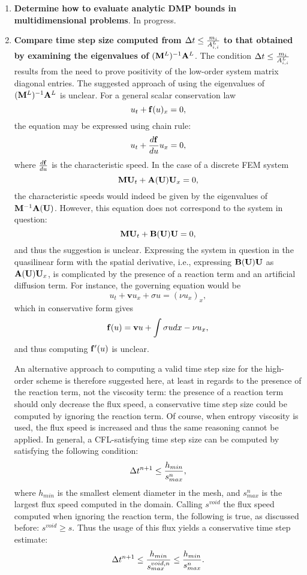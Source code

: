 \begin{enumerate}
\item \textbf{Determine how to evaluate analytic DMP bounds in multidimensional problems}.
In progress.

\item \textbf{Compare time step size computed from $\Delta t\leq\frac{m_i}{A^L_{i,i}}$ to
that obtained by examining the eigenvalues of $(\mathbf{M}^L)^{-1}\mathbf{A}^L$}.
The condition $\Delta t\leq\frac{m_i}{A^L_{i,i}}$ results from the need to prove
positivity of the low-order system matrix diagonal entries. The suggested approach
of using the eigenvalues of $(\mathbf{M}^L)^{-1}\mathbf{A}^L$ is unclear. For a general scalar conservation
law
\[
  u_t + \mathbf{f}(u)_x = 0,
\]
the equation may be expressed using chain rule:
\[
  u_t + \frac{d\mathbf{f}}{du}u_x = 0,
\]
where $\frac{d\mathbf{f}}{du}$ is the characteristic speed\cite{toro}. In the case of a
discrete FEM system
\[
  \mathbf{M}\mathbf{U}_t + \mathbf{A}(\mathbf{U})\mathbf{U}_x = 0,
\]
the characteristic speeds would indeed be given by the eigenvalues of $\mathbf{M}^{-1}\mathbf{A}(\mathbf{U})$.
However, this equation does not correspond to the system in question:
\[
  \mathbf{M}\mathbf{U}_t + \mathbf{B}(\mathbf{U})\mathbf{U} = 0,
\]
and thus the suggestion is unclear. Expressing the system in question in the
quasilinear form with the spatial derivative, i.e., expressing $\mathbf{B}(\mathbf{U})\mathbf{U}$
as $\mathbf{A}(\mathbf{U})\mathbf{U}_x$, is complicated by the presence of a reaction term and an
artificial diffusion term. For instance, the governing equation would be
\[
  u_t + \mathbf{v}u_x + \sigma u = (\nu u_x)_x,
\]
which in conservative form gives
\[
  \mathbf{f}(u) = \mathbf{v}u + \int\sigma u dx - \nu u_x,
\]
and thus computing $\mathbf{f}'(u)$ is unclear.

An alternative approach to computing a valid time step size for the high-order
scheme is therefore suggested here, at least in regards to the presence of the
reaction term, not the viscosity term: the presence of a reaction term should only decrease
the flux speed, a conservative time step size could be computed by ignoring
the reaction term. Of course, when entropy viscosity is used, the flux speed
is increased and thus the same reasoning cannot be applied. In general, a CFL-satisfying
time step size can be computed by satisfying the following condition:
\[
  \Delta t^{n+1}\leq\frac{h_{min}}{s_{max}^n},
\]
where $h_{min}$ is the smallest element diameter in the mesh, and $s_{max}^n$ is the
largest flux speed computed in the domain. Calling $s^{void}$ the flux speed
computed when ignoring the reaction term, the following is true, as discussed
before: $s^{void}\geq s$. Thus the usage of this flux yields a conservative
time step estimate:
\[
  \Delta t^{n+1}\leq\frac{h_{min}}{s_{max}^{void,n}}\leq\frac{h_{min}}{s_{max}^{n}}.
\]


\end{enumerate}
